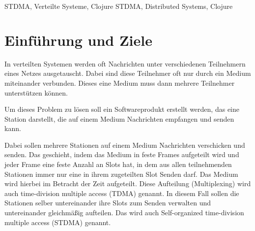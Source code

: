 \documentclass[draft=false
              ,paper=a4
              ,twoside=false
              ,fontsize=11pt
              ,headsepline
              ,BCOR10mm
              ,DIV11
              ]{scrbook}
\begin{document}


\frontmatter

\maketitle

\onehalfspacing

\HAWAbstractPage
{STDMA, Verteilte Systeme, Clojure}%
{STDMA, Distributed Systems, Clojure}%

\newpage
\singlespacing

\tableofcontents
\newpage
\lstlistoflistings

\mainmatter
\onehalfspacing

\chapter{Einführung und Ziele}
In verteilten Systemen werden oft Nachrichten unter verschiedenen Teilnehmern eines Netzes ausgetauscht. Dabei sind diese Teilnehmer oft nur durch ein Medium miteinander verbunden. Dieses eine Medium muss dann mehrere Teilnehmer unterstützen können.

Um dieses Problem zu lösen soll ein Softwareprodukt erstellt werden, das eine Station darstellt, die auf einem Medium Nachrichten empfangen und senden kann.

Dabei sollen mehrere Stationen auf einem Medium Nachrichten verschicken und senden. Das geschieht, indem das Medium in feste Frames aufgeteilt wird und jeder Frame eine feste Anzahl an Slots hat, in dem aus allen teilnehmenden Stationen immer nur eine in ihrem zugeteilten Slot Senden darf. Das Medium wird hierbei im Betracht der Zeit aufgeteilt. Diese Aufteilung (Multiplexing) wird auch time-division multiple access (TDMA) genannt.
In diesem Fall sollen die Stationen selber untereinander ihre Slots zum Senden verwalten und untereinander gleichmäßig aufteilen.
Das wird auch Self-organized time-division multiple access (STDMA) genannt.
\end{document}

